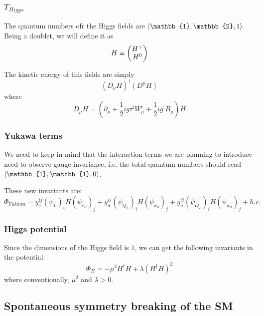    \subsubsection{$T_{Higgs}$}
    The quantum numbers ofr the Higgs fields are $\ket{\mathbb{1}, \mathbb{2}, 1}$. Being a doublet, we will define it as
    \begin{equation}
      H \equiv \begin{pmatrix}{H^+}\\{H^0}\end{pmatrix}
    \end{equation}

    The kinetic energy of this fields are simply
    \begin{equation}
      (D_\mu H)^\dagger (D^\mu H)
    \end{equation}
    where
    \begin{equation}
      D_\mu H = \left(\partial_\mu + \frac{1}{2} i g \tau^i W^i_\mu + \frac{1}{2} i g^\prime B_\mu \right) H
    \end{equation}

    \subsubsection{Yukawa terms}
    We need to keep in mind that the interaction terms we are planning to introduce need to observe gauge invariance, i.e. the total quantum numbers should read $\ket{\mathbb{1}, \mathbb{1}, 0}$.

    These new invariants are:
    \begin{equation}
      \Phi_{Yukawa} = y_e^{ij} (\bar{\psi}_L)_i H (\psi_{e_R})_j + y_d^{ij} (\bar{\psi}_{Q_L})_i H (\psi_{d_R})_j + y_u^{ij} (\bar{\psi}_{Q_L})_i H (\psi_{u_R})_j + h.c.
    \end{equation}

    \subsubsection{Higgs potential}
    Since the dimensions of the Higgs field is $1$, we can get the following invariants in the potential:
    \begin{equation}
      \Phi_H = -\mu^2 H^\dagger H + \lambda (H^\dagger H )^2
    \end{equation}
    where conventionally, $\mu^2$ and $\lambda > 0$.

  \subsection{Spontaneous symmetry breaking of the SM}
  \label{ch:15:review of sm:spontaneous breaking of sm}

